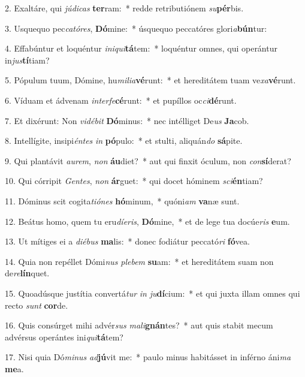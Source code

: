 2. Exaltáre, qui \textit{jú}\textit{di}\textit{cas} \textbf{ter}ram:~*  redde retributiónem \textit{su}\textbf{pér}bis.\

3. Usquequo pec\textit{ca}\textit{tó}\textit{res}, \textbf{Dó}mine:~*  úsquequo peccatóres glori\textit{a}\textbf{bún}tur:\

4. Effabúntur et loquéntur \textit{in}\textit{i}\textit{qui}\textbf{tá}tem:~*  loquéntur omnes, qui operántur in\textit{jus}\textbf{tí}tiam?\

5. Pópulum tuum, Dómine, hu\textit{mi}\textit{li}\textit{a}\textbf{vé}runt:~*  et hereditátem tuam ve\textit{xa}\textbf{vé}runt.\

6. Víduam et ádvenam \textit{in}\textit{ter}\textit{fe}\textbf{cé}runt:~*  et pupíllos oc\textit{ci}\textbf{dé}runt.\

7. Et dixérunt: Non \textit{vi}\textit{dé}\textit{bit} \textbf{Dó}minus:~*  nec intélliget De\textit{us} \textbf{Ja}cob.\

8. Intellígite, insipi\textit{én}\textit{tes} \textit{in} \textbf{pó}pulo:~*  et stulti, aliquán\textit{do} \textbf{sá}pite.\

9. Qui plantávit \textit{au}\textit{rem}, \textit{non} \textbf{áu}diet?~*  aut qui finxit óculum, non \textit{con}\textbf{sí}derat?\

10. Qui córripit \textit{Gen}\textit{tes}, \textit{non} \textbf{ár}guet:~*  qui docet hóminem \textit{sci}\textbf{én}tiam?\

11. Dóminus scit cogita\textit{ti}\textit{ó}\textit{nes} \textbf{hó}minum,~*  quóni\textit{am} \textbf{va}næ sunt.\

12. Beátus homo, quem tu eru\textit{dí}\textit{e}\textit{ris}, \textbf{Dó}mine,~*  et de lege tua docúe\textit{ris} \textbf{e}um.\

13. Ut mítiges ei a \textit{di}\textit{é}\textit{bus} \textbf{ma}lis:~*  donec fodiátur peccató\textit{ri} \textbf{fó}vea.\

14. Quia non repéllet Dómi\textit{nus} \textit{ple}\textit{bem} \textbf{su}am:~*  et hereditátem suam non de\textit{re}\textbf{lín}quet.\

15. Quoadúsque justítia convertá\textit{tur} \textit{in} \textit{ju}\textbf{dí}cium:~*  et qui juxta illam omnes qui recto \textit{sunt} \textbf{cor}de.\

16. Quis consúrget mihi advér\textit{sus} \textit{ma}\textit{li}\textbf{gnán}tes?~*  aut quis stabit mecum advérsus operántes ini\textit{qui}\textbf{tá}tem?\

17. Nisi quia Dó\textit{mi}\textit{nus} \textit{ad}\textbf{jú}vit me:~*  paulo minus habitásset in inférno áni\textit{ma} \textbf{me}a.\


